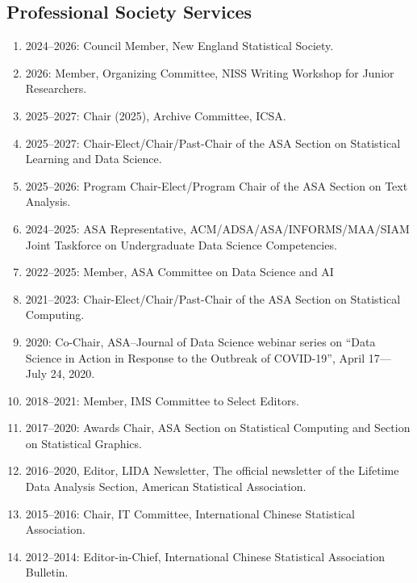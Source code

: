 \documentclass[Statistics]{vita}
\begin{document}
\begin{vita}
  \subsection{Professional Society Services}
  \begin{enumerate}
  \item 2024--2026: Council Member, New England Statistical Society.
  \item 2026: Member, Organizing Committee, NISS Writing Workshop for Junior Researchers.
  \item 2025--2027: Chair (2025), Archive Committee, ICSA.
  \item 2025--2027: Chair-Elect/Chair/Past-Chair of the ASA Section on Statistical Learning and Data Science.
  \item 2025--2026: Program Chair-Elect/Program Chair of the ASA Section on Text Analysis.
  \item 2024--2025: ASA Representative, ACM/ADSA/ASA/INFORMS/MAA/SIAM Joint Taskforce on Undergraduate Data Science Competencies.
  \item 2022--2025: Member, ASA Committee on Data Science and AI
  \item 2021--2023: Chair-Elect/Chair/Past-Chair of the ASA Section on Statistical Computing.
  \item 2020: Co-Chair, ASA--Journal of Data Science webinar series on ``Data Science in Action in Response to the Outbreak of COVID-19'', April 17--- July 24, 2020.
  \item 2018--2021: Member, IMS Committee to Select Editors.
  \item 2017--2020: Awards Chair, ASA Section on Statistical Computing and Section on Statistical Graphics.
  \item 2016--2020, Editor, LIDA Newsletter, The official newsletter of the Lifetime Data Analysis Section, American Statistical Association.
  \item 2015--2016: Chair, IT Committee, International Chinese Statistical Association.
  \item 2012--2014: Editor-in-Chief, International Chinese Statistical Association Bulletin.
  \end{enumerate}

\end{vita}
\end{document}
